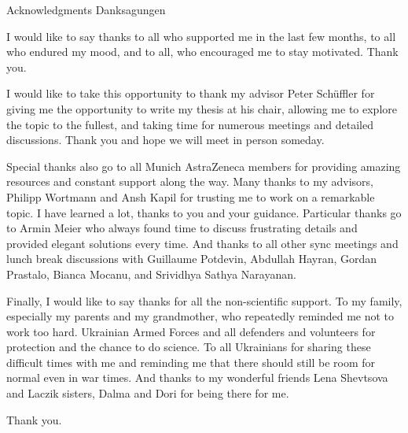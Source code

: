 \makeatletter
{}
{}
{}
\makeatother
\thispagestyle{empty}

\vspace*{20mm}

\begin{center}
\makeatletter
{}
{ Acknowledgments}
{ Danksagungen}
\makeatother
\end{center}

\vspace{10mm}

I would like to say thanks to all who supported me in the last few months, to all who endured my mood, and to all, who encouraged me to stay motivated. Thank you.

I would like to take this opportunity to thank my advisor Peter Schüffler for giving me the opportunity to write my thesis at his chair, allowing me to explore the topic to the fullest, and taking time for numerous meetings and detailed discussions. Thank you and hope we will meet in person someday.

Special thanks also go to all Munich AstraZeneca members for providing amazing resources and constant support along the way. Many thanks to my advisors, Philipp Wortmann and Ansh Kapil for trusting me to work on a remarkable topic. I have learned a lot, thanks to you and your guidance. Particular thanks go to Armin Meier who always found time to discuss frustrating details and provided elegant solutions every time. And thanks to all other sync meetings and lunch break discussions with Guillaume Potdevin, Abdullah Hayran, Gordan Prastalo, Bianca Mocanu, and Srividhya Sathya Narayanan. 

Finally, I would like to say thanks for all the non-scientific support. To my family, especially my parents and my grandmother, who repeatedly reminded me not to work too hard.
Ukrainian Armed Forces and all defenders and volunteers for protection and the chance to do science. To all Ukrainians for sharing these difficult times with me and reminding me that there should still be room for normal even in war times.  And thanks to my wonderful friends Lena Shevtsova and Laczik sisters, Dalma and Dori for being there for me.

Thank you.

\cleardoublepage{}
